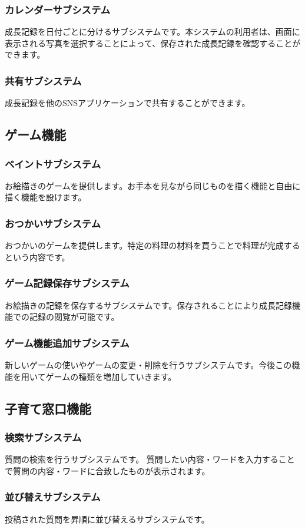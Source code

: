 \documentclass[a4j]{jarticle}
\begin{document}
\subsubsection*{カレンダーサブシステム}
成長記録を日付ごとに分けるサブシステムです。本システムの利用者は、画面に表示される写真を選択することによって、保存された成長記録を確認することができます。
\subsubsection*{共有サブシステム}
成長記録を他のSNSアプリケーションで共有することができます。

\subsection{ゲーム機能}
\subsubsection*{ペイントサブシステム}
お絵描きのゲームを提供します。お手本を見ながら同じものを描く機能と自由に描く機能を設けます。
\subsubsection*{おつかいサブシステム}
おつかいのゲームを提供します。特定の料理の材料を買うことで料理が完成するという内容です。
\subsubsection*{ゲーム記録保存サブシステム}
お絵描きの記録を保存するサブシステムです。保存されることにより成長記録機能での記録の閲覧が可能です。
\subsubsection*{ゲーム機能追加サブシステム}
新しいゲームの使いやゲームの変更・削除を行うサブシステムです。今後この機能を用いてゲームの種類を増加していきます。

\subsection{子育て窓口機能}
\subsubsection*{検索サブシステム}
質問の検索を行うサブシステムです。 質問したい内容・ワードを入力することで質問の内容・ワードに合致したものが表示されます。
\subsubsection*{並び替えサブシステム}
投稿された質問を昇順に並び替えるサブシステムです。
\end{document}
